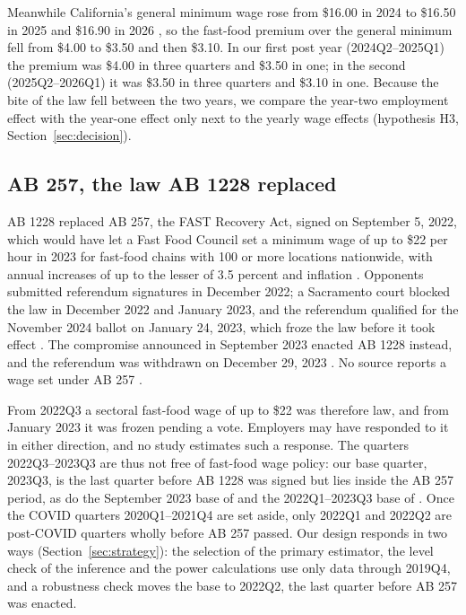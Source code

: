 Meanwhile California's general minimum wage rose from \$16.00 in 2024 to \$16.50 in 2025 and
\$16.90 in 2026 \citep{dir2026mw}, so the fast-food premium over the general minimum fell from
\$4.00 to \$3.50 and then \$3.10. In our first post year (2024Q2--2025Q1) the premium was \$4.00
in three quarters and \$3.50 in one; in the second (2025Q2--2026Q1) it was \$3.50 in three
quarters and \$3.10 in one. Because the bite of the law fell between the two years, we compare
the year-two employment effect with the year-one effect only next to the yearly wage effects
(hypothesis H3, Section~\ref{sec:decision}).

\subsection{AB 257, the law AB 1228 replaced}
\label{sec:ab257}

AB 1228 replaced AB 257, the FAST Recovery Act, signed on September 5, 2022, which would have let
a Fast Food Council set a minimum wage of up to \$22 per hour in 2023 for fast-food chains with
100 or more locations nationwide, with annual increases of up to the lesser of 3.5 percent and
inflation \citep{melo2026covered,sosinskiy2026effects}. Opponents submitted referendum
signatures in December 2022; a Sacramento court blocked the law in December 2022 and January
2023, and the referendum qualified for the November 2024 ballot on January 24, 2023, which froze
the law before it took effect \citep{ballotpedia2024ab257,melo2026covered,sosinskiy2026effects}.
The compromise announced in September 2023 enacted AB 1228 instead, and the referendum was
withdrawn on December 29, 2023 \citep{sosinskiy2026effects,ballotpedia2024ab257}. No source
reports a wage set under AB 257 \citep{hamdi2025wage,melo2026covered}.

From 2022Q3 a sectoral fast-food wage of up to \$22 was therefore law, and from January 2023 it
was frozen pending a vote. Employers may have responded to it in either direction, and no study
estimates such a response. The quarters 2022Q3--2023Q3 are thus not free of fast-food wage
policy: our base quarter, 2023Q3, is the last quarter before AB 1228 was signed but lies inside
the AB 257 period, as do the September 2023 base of \citet{clemens2026employment} and the
2022Q1--2023Q3 base of \citet[Table~1, Panel~B]{dube2026labor}. Once the COVID quarters
2020Q1--2021Q4 are set aside, only 2022Q1 and 2022Q2 are post-COVID quarters wholly before AB 257
passed. Our design responds in two ways (Section~\ref{sec:strategy}): the selection of the
primary estimator, the level check of the inference and the power calculations use only data
through 2019Q4, and a robustness check moves the base to 2022Q2, the last quarter before AB 257
was enacted.

